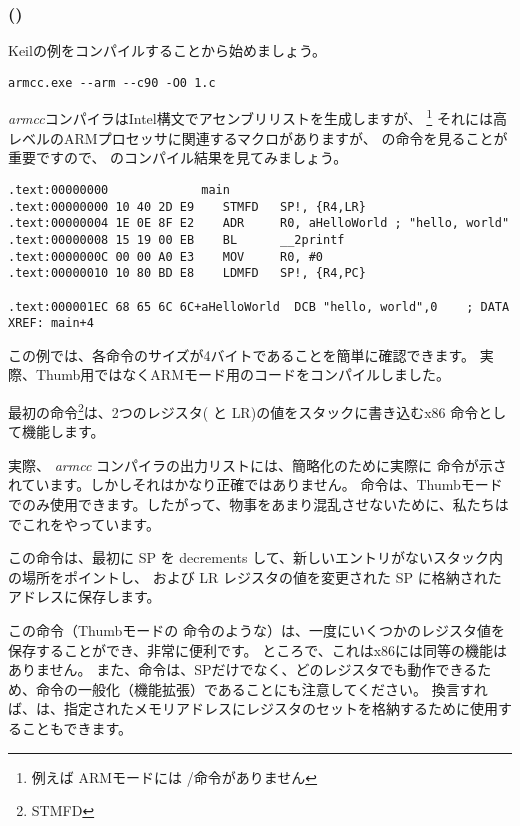 \subsubsection{\NonOptimizingKeilVI (\ARMMode)}

Keilの例をコンパイルすることから始めましょう。

\begin{lstlisting}
armcc.exe --arm --c90 -O0 1.c 
\end{lstlisting}

\myindex{\IntelSyntax}
\emph{armcc}コンパイラはIntel構文でアセンブリリストを生成しますが、
\footnote{例えば ARMモードには \PUSH/\POP 命令がありません}
それには高レベルのARMプロセッサに関連するマクロがありますが、 の命令を見ることが重要ですので、 \IDA のコンパイル結果を見てみましょう。

\begin{lstlisting}[caption=\NonOptimizingKeilVI (\ARMMode) \IDA,style=customasmARM]
.text:00000000             main
.text:00000000 10 40 2D E9    STMFD   SP!, {R4,LR}
.text:00000004 1E 0E 8F E2    ADR     R0, aHelloWorld ; "hello, world"
.text:00000008 15 19 00 EB    BL      __2printf
.text:0000000C 00 00 A0 E3    MOV     R0, #0
.text:00000010 10 80 BD E8    LDMFD   SP!, {R4,PC}

.text:000001EC 68 65 6C 6C+aHelloWorld  DCB "hello, world",0    ; DATA XREF: main+4
\end{lstlisting}

この例では、各命令のサイズが4バイトであることを簡単に確認できます。
実際、Thumb用ではなくARMモード用のコードをコンパイルしました。

最初の命令\footnote{\ac{STMFD}}は、2つのレジスタ( と \ac{LR})の値をスタックに書き込むx86 \PUSH 命令として機能します。

実際、 \emph{armcc} コンパイラの出力リストには、簡略化のために実際に  命令が示されています。しかしそれはかなり正確ではありません。 \PUSH 命令は、Thumbモードでのみ使用できます。したがって、物事をあまり混乱させないために、私たちは \IDA でこれをやっています。

この命令は、最初に \ac{SP} を \glspl{decrement} して、新しいエントリがないスタック内の場所をポイントし、  および \ac{LR} レジスタの値を変更された \ac{SP} に格納されたアドレスに保存します。

この命令（Thumbモードの \PUSH 命令のような）は、一度にいくつかのレジスタ値を保存することができ、非常に便利です。
ところで、これはx86には同等の機能はありません。
また、命令は、\ac{SP}だけでなく、どのレジスタでも動作できるため、\PUSH 命令の一般化（機能拡張）であることにも注意してください。
換言すれば、は、指定されたメモリアドレスにレジスタのセットを格納するために使用することもできます。

